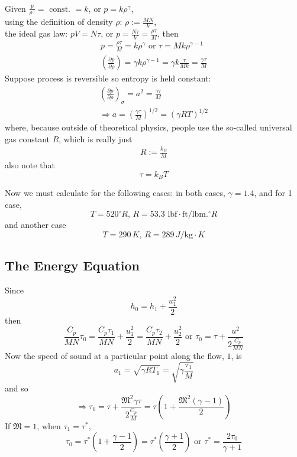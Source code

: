 \documentclass[twoside,landscape,10pt]{amsart}
\theoremstyle{plain}
\theoremstyle{definition}
\theoremstyle{remark}
\theoremstyle{remark}
\begin{document}
\begin{multicols*}{2}
\quad \\ 
Given $\frac{p}{\rho^{\gamma}} = \text{ const. } = k$, or $p = k\rho^{\gamma}$, \\
using the definition of density $\rho$: $\rho := \frac{MN}{V}$, \\
the ideal gas law: $pV = N\tau$, or $p = \frac{N\tau}{V} = \frac{\rho \tau }{M}$, then
\[
\begin{gathered} 
p = \frac{\rho \tau }{M} = k\rho^{\gamma} \text{ or } \tau = Mk \rho^{\gamma -1} \\
\left(\frac{ \partial p }{ \partial \rho} \right) = \gamma k \rho^{\gamma -1}  = \gamma k \frac{\tau}{ Mk} = \frac{\gamma \tau}{M} 
\end{gathered}
\]
Suppose process is reversible so entropy is held constant:
\[
\begin{gathered}
\left( \frac{\partial p}{ \partial \rho} \right)_{\sigma } = a^2 = \frac{\gamma \tau}{M} \\ 
\Longrightarrow a = \left( \frac{\gamma \tau}{M} \right)^{1/2} = (\gamma RT)^{1/2}
\end{gathered}
\]
where, because outside of theoretical physics, people use the so-called universal gas constant $R$, which is really just
\begin{equation}
\begin{gathered} 
\boxed{ R := \frac{k_B}{M}  }
\end{gathered} 
\end{equation}
also note that 
\begin{equation}
\boxed{ \tau = k_B T } 
\end{equation}

Now we must calculate for the following cases: in both cases, $\gamma  = 1.4$, and for 1 case,
\[
T = 520^{\circ} R, \, R = 53.3 \text{ lbf} \cdot \text{ft} / \text{lbm} .^{\circ} R
\]
and another case
\[
T = 290 \, K, \, R = 289 \, J/ \text{kg} \cdot K
\]

\subsection{The Energy Equation}

Since 
\[
h_0 = h_1 + \frac{u_1^2}{2}
\]
then
\[
\frac{C_p}{MN} \tau_0 = \frac{C_p \tau_1}{MN} + \frac{u_1^2}{2} = \frac{C_p \tau_2}{MN} + \frac{u_2^2}{2} \text{ or } \tau_0 = \tau + \frac{u^2}{ 2 \frac{C_p}{MN} }
\]
Now the speed of sound at a particular point along the flow, $1$, is 
\[
a_1 = \sqrt{ \gamma RT_1 } = \sqrt{ \gamma \frac{\tau_1}{M} }
\]
and so 
\[
\Longrightarrow \tau_0 = \tau + \frac{ \mathfrak{M}^2 \gamma \tau }{ 2 \frac{C_p}{M}} = \tau \left( 1 + \frac{ \mathfrak{M}^2 (\gamma-1) }{2} \right)
\]
If $\mathfrak{M}=1$, when $\tau_1=\tau^*$, 
\[
\tau_0 = \tau^* \left( 1 + \frac{\gamma -1}{2} \right) = \tau^* \left( \frac{\gamma + 1 }{2} \right)
\text{ or } \tau^* = \frac{ 2\tau_0 }{ \gamma + 1 } 
\]


\end{multicols*}
\end{document}
